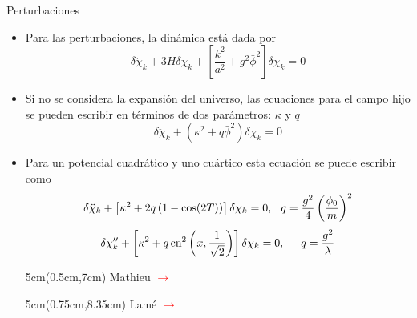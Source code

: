 \documentclass{beamer}
\begin{document}
            \begin{frame}{Perturbaciones}
                \begin{itemize}
                    \item[\textcolor{brown}{$\bullet$}] Para las perturbaciones, la dinámica está dada por 
                        \begin{equation*}
                            \delta \ddot{\chi}_k + 3 H \delta \dot{\chi}_k + \left[ \frac{k^2}{a^2} + g^2 \bar{\phi}^2 \right] \delta \chi_k = 0
                        \end{equation*}
                    \item[\textcolor{brown}{$\bullet$}] Si no se considera la expansión del universo, las ecuaciones para el campo hijo se pueden escribir en términos de dos parámetros: $\kappa$ y $q$
                        \begin{equation*}
                            \delta \ddot{\chi}_k + \left( \kappa^2 + q \bar{\phi}^2 \right) \delta \chi_k = 0
                        \end{equation*}
                    \item[\textcolor{brown}{$\bullet$}] Para un potencial cuadrático y uno cuártico esta ecuación se puede escribir como
                        \begin{equation*}
                            \delta \ddot{\chi}_k + \left[ \kappa^2 + 2 q \left( 1 - \cos (2T) \right) \right] \delta \chi_k = 0, \hspace{0.25cm} q = \frac{g^2}{4} \left( \frac{\phi_0}{m} \right)^2 
                        \end{equation*}
                        \begin{equation*}
                            \delta \chi_k^{\prime \prime} + \left[ \kappa^2 + q \, \text{cn}^2 \left( x, \frac{1}{\sqrt{2}} \right) \right] \delta \chi_k = 0, \hspace{0.5cm} q = \frac{g^2}{\lambda}
                        \end{equation*}

                        \begin{textblock*}{5cm}(0.5cm,7cm)
                            \footnotesize{Mathieu \textcolor{red}{$\rightarrow$}}
                        \end{textblock*}

                        \begin{textblock*}{5cm}(0.75cm,8.35cm)
                            \footnotesize{Lamé \textcolor{red}{$\rightarrow$}}
                        \end{textblock*}
                \end{itemize}
            \end{frame}
\end{document}
